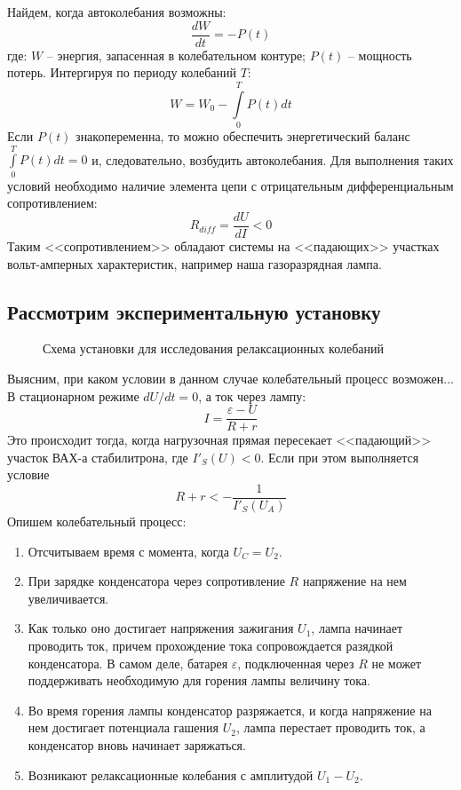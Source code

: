 \documentclass[a4paper,12pt]{article}
\begin{document}
Найдем, когда автоколебания возможны: 
$$
\frac{dW}{dt} = -P(t)
$$
где:
$W$ -- энергия, запасенная в колебательном контуре;
$P(t)$ -- мощность потерь.
Интергируя по периоду колебаний $T$:
$$
W = W_0 - \int\limits_0^T P(t)dt 
$$
Если $P(t)$ знакопеременна, то можно обеспечить энергетический баланс $\int\limits_0^T P(t)dt = 0$ и, следовательно, возбудить автоколебания. Для выполнения таких условий необходимо наличие элемента цепи с отрицательным дифференциальным сопротивлением:
$$
R_{diff} = \frac{dU}{dI} < 0
$$
Таким <<сопротивлением>> обладают системы на <<падающих>> участках вольт-амперных характеристик, например наша газоразрядная лампа.
\subsection*{Рассмотрим экспериментальную установку} 
\begin{figure}[h]
\caption{Схема установки для исследования релаксационных колебаний}
\label{fig:fac1}
\end{figure}
Выясним, при каком условии в данном случае колебательный процесс возможен...
В стационарном режиме $dU/dt = 0$, а ток через лампу:
$$
I = \frac{\varepsilon - U}{R + r}
$$
Это происходит тогда, когда нагрузочная прямая пересекает <<падающий>> участок ВАХ-а стабилитрона, где $I'_S(U) < 0$. Если при этом выполняется условие
$$
R + r < -\frac{1}{I'_S(U_A)}
$$
Опишем колебательный процесс:
\begin{enumerate}
\item Отсчитываем время с момента, когда $U_C = U_2$.
\item При зарядке конденсатора через сопротивление $R$ напряжение на нем увеличивается.
\item Как только оно достигает напряжения зажигания $U_1$, лампа начинает проводить ток, причем прохождение тока сопровождается разядкой конденсатора. В самом деле, батарея $\varepsilon$, подключенная через $R$ не может поддерживать необходимую для горения лампы величину тока.
\item Во время горения лампы конденсатор разряжается, и когда напряжение на нем достигает потенциала гашения $U_2$, лампа перестает проводить ток, а конденсатор вновь начинает заряжаться.
\item Возникают релаксационные колебания с амплитудой $U_1 - U_2$.
\end{enumerate}
\end{document}
